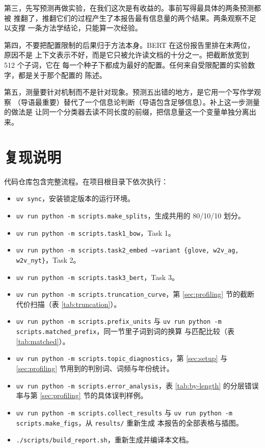 \documentclass[11pt]{article}
\newcommand{\code}[1]{\texttt{\small #1}}
\begin{document}
第三，先写预测再做实验，在我们这次是有收益的。事前写得最具体的两条预测都被
推翻了，推翻它们的过程产生了本报告最有信息量的两个结果。两条观察不足以支撑
一条方法学结论，只能算一次经验。

第四，不要把配置限制的后果归于方法本身。BERT 在这份报告里排在末两位，原因不是
上下文表示不好，而是它只被允许读文档的十分之一。把截断放宽到 512 个子词，它在
每一个种子下都成为最好的配置。任何来自受限配置的实验数字，都是关于那个配置的
陈述。

第五，测量要针对机制而不是针对现象。预测五出错的地方，是它用一个写作学观察
（导语最重要）替代了一个信息论判断（导语包含足够信息）。补上这一步测量的做法是
让同一个分类器去读不同长度的前缀，把信息量这一个变量单独分离出来。

\section{复现说明}

代码仓库包含完整流程。在项目根目录下依次执行：

\begin{itemize}[leftmargin=1.4em,itemsep=1pt]
  \item \code{uv sync}，安装锁定版本的运行环境。
  \item \code{uv run python -m scripts.make\_splits}，生成共用的 80/10/10 划分。
  \item \code{uv run python -m scripts.task1\_bow}，Task 1。
  \item \code{uv run python -m scripts.task2\_embed --variant \{glove,
        w2v\_ag, w2v\_nyt\}}，Task 2。
  \item \code{uv run python -m scripts.task3\_bert}，Task 3。
  \item \code{uv run python -m scripts.truncation\_curve}，第 \ref{sec:profiling}
        节的截断代价扫描（表 \ref{tab:truncation}）。
  \item \code{uv run python -m scripts.prefix\_units} 与
        \code{uv run python -m scripts.matched\_prefix}，同一节里子词到词的换算
        与匹配比较（表 \ref{tab:matched}）。
  \item \code{uv run python -m scripts.topic\_diagnostics}，第 \ref{sec:setup}
        与 \ref{sec:profiling} 节用到的判别词、词频与年份统计。
  \item \code{uv run python -m scripts.error\_analysis}，表 \ref{tab:by-length}
        的分层错误率与第 \ref{sec:profiling} 节的具体误判样例。
  \item \code{uv run python -m scripts.collect\_results} 与
        \code{uv run python -m scripts.make\_figs}，从 \code{results/} 重新生成
        本报告的全部表格与插图。
  \item \code{./scripts/build\_report.sh}，重新生成并编译本文档。
\end{itemize}
\end{document}
